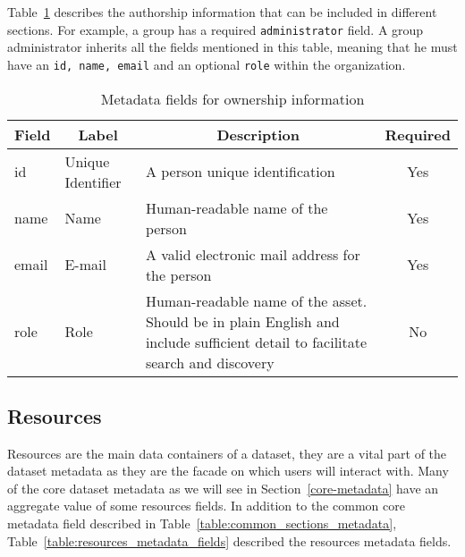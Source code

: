 Table~\ref{table:ownership_metadata_fields} describes the authorship information that can be included in different sections. For example, a group has a required \texttt{administrator} field. A group administrator inherits all the fields mentioned in this table, meaning that he must have an \texttt{id, name, email} and an optional \texttt{role} within the organization.

\begin{table}[hb]
\centering
\begin{adjustwidth}{-.4in}{-.4in}
\small
\begin{tabular}{|l|p{2cm}|p{9cm}|c|}
\hline
\multicolumn{1}{|c|}{{\bf Field}} & \multicolumn{1}{c|}{{\bf Label}} & \multicolumn{1}{c|}{{\bf Description}}                                                                                        & {\bf Required} \\ \hline
id                                & Unique Identifier                & A person unique identification                                                                                                & Yes            \\ \hline
name                              & Name                             & Human-readable name of the person                                                                                             & Yes            \\ \hline
email                             & E-mail                           & A valid electronic mail address for the person                                                                                & Yes            \\ \hline
role                              & Role                             & Human-readable name of the asset. Should be in plain English and include sufficient detail to facilitate search and discovery & No             \\ \hline
\end{tabular}
\caption{Metadata fields for ownership information}
\label{table:ownership_metadata_fields}
\end{adjustwidth}
\end{table}

\subsection{Resources}

Resources are the main data containers of a dataset, they are a vital part of the dataset metadata as they are the facade on which users will interact with. Many of the core dataset metadata as we will see in Section~\ref{core-metadata} have an aggregate value of some resources fields. In addition to the common core metadata field described in Table~\ref{table:common_sections_metadata}, Table~\ref{table:resources_metadata_fields} described the resources metadata fields.

